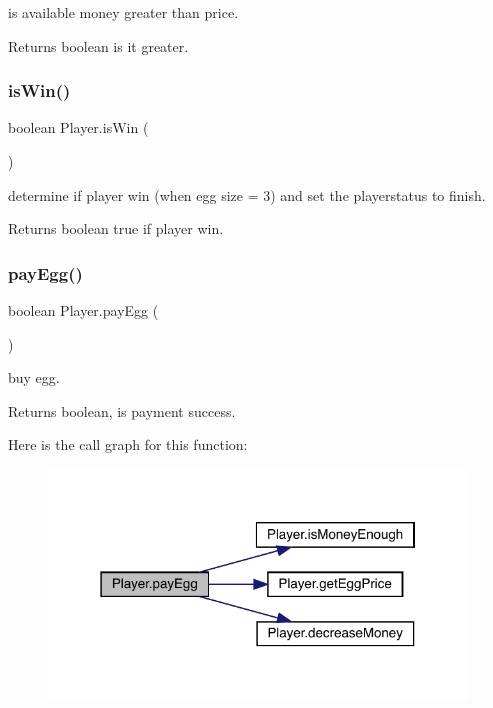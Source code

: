 is available money greater than price. \begin{DoxyReturn}{Returns}
boolean is it greater. 
\end{DoxyReturn}
\mbox{\label{class_player_ad54876d910aca3a92ae90ded139953ec}} 
\subsubsection{\texorpdfstring{is\+Win()}{isWin()}}
{\footnotesize\ttfamily boolean Player.\+is\+Win (\begin{DoxyParamCaption}{ }\end{DoxyParamCaption})\hspace{0.3cm}{\ttfamily [inline]}}

determine if player win (when egg size = 3) and set the playerstatus to finish. \begin{DoxyReturn}{Returns}
boolean true if player win. 
\end{DoxyReturn}
\mbox{\label{class_player_a8854a672f539bc72f7f09b57d20e8467}} 
\subsubsection{\texorpdfstring{pay\+Egg()}{payEgg()}}
{\footnotesize\ttfamily boolean Player.\+pay\+Egg (\begin{DoxyParamCaption}{ }\end{DoxyParamCaption})\hspace{0.3cm}{\ttfamily [inline]}}

buy egg. \begin{DoxyReturn}{Returns}
boolean, is payment success. 
\end{DoxyReturn}
Here is the call graph for this function\+:
\nopagebreak
\begin{figure}[H]
\begin{center}
\leavevmode
\includegraphics[width=315pt]{class_player_a8854a672f539bc72f7f09b57d20e8467_cgraph}
\end{center}
\end{figure}
\mbox{\label{class_player_a61e99d628085fda9765af1d27b5d6d8d}} 

